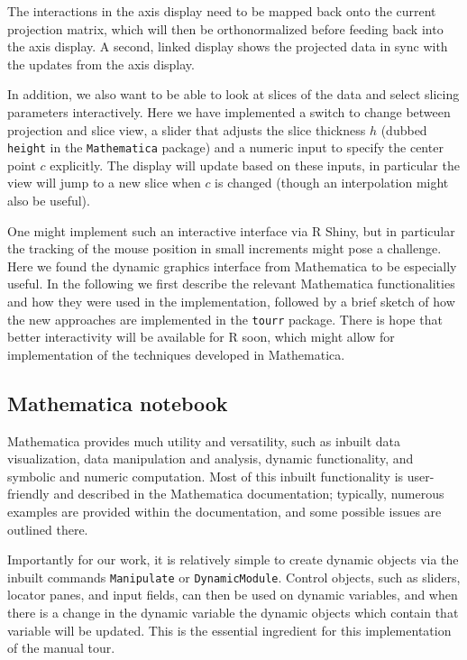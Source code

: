 \documentclass[]{interact}
\theoremstyle{plain}%
\theoremstyle{definition}
\theoremstyle{remark}
\begin{document}
The interactions in the axis display need to be mapped back onto the
current projection matrix, which will then be orthonormalized before
feeding back into the axis display. A second, linked display shows the
projected data in sync with the updates from the axis display.

In addition, we also want to be able to look at slices of the data and
select slicing parameters interactively. Here we have implemented a
switch to change between projection and slice view, a slider that
adjusts the slice thickness \(h\) (dubbed \texttt{height} in the
\texttt{Mathematica} package) and a numeric input to specify the center
point \(c\) explicitly. The display will update based on these inputs,
in particular the view will jump to a new slice when \(c\) is changed
(though an interpolation might also be useful).

One might implement such an interactive interface via R Shiny, but in
particular the tracking of the mouse position in small increments might
pose a challenge. Here we found the dynamic graphics interface from
Mathematica to be especially useful. In the following we first describe
the relevant Mathematica functionalities and how they were used in the
implementation, followed by a brief sketch of how the new approaches are
implemented in the \texttt{tourr} package. There is hope that better
interactivity will be available for R soon, which might allow for
implementation of the techniques developed in Mathematica.

\hypertarget{mathematica-notebook}{%
\subsection{Mathematica notebook}\label{mathematica-notebook}}

Mathematica provides much utility and versatility, such as inbuilt data
visualization, data manipulation and analysis, dynamic functionality,
and symbolic and numeric computation. Most of this inbuilt functionality
is user-friendly and described in the Mathematica documentation;
typically, numerous examples are provided within the documentation, and
some possible issues are outlined there.

Importantly for our work, it is relatively simple to create dynamic
objects via the inbuilt commands \texttt{Manipulate} or
\texttt{DynamicModule}. Control objects, such as sliders, locator panes,
and input fields, can then be used on dynamic variables, and when there
is a change in the dynamic variable the dynamic objects which contain
that variable will be updated. This is the essential ingredient for this
implementation of the manual tour.
\end{document}
